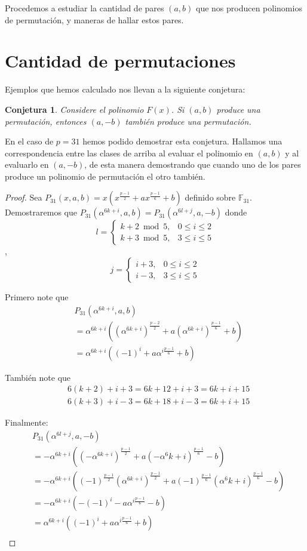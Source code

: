 \documentclass[12pt]{article}
\newtheorem{conjecture}{Conjetura}
\begin{document}
Procedemos a estudiar la cantidad de pares $(a,b)$ que nos producen polinomios de permutaci\'on, y maneras de hallar estos pares.

\section{Cantidad de permutaciones}\label{orto}

Ejemplos que hemos calculado nos llevan a la siguiente conjetura:
\begin{conjecture}
	Considere el polinomio $F(x)$. Si $(a,b)$ produce una permutaci\'on, entonces $(a,-b)$ tambi\'en produce una permutaci\'on.
\end{conjecture}

En el caso de $p=31$ hemos podido demostrar esta conjetura. Hallamos una correspondencia entre las clases de arriba al evaluar el polinomio en $(a,b)$ y al evaluarlo en $(a,-b)$, de esta manera demostrando que cuando uno de los pares produce un polinomio de permutaci\'on el otro tambi\'en.

\begin{proof}
	Sea $P_{31}(x,a,b) = x(x^{\frac{p-1}{2}}+ax^{\frac{p-1}{6}}+b)$ definido sobre $\mathbb{F}_{31}$. Demostraremos que $P_{31}(\alpha^{6k+i},a,b) = P_{31}(\alpha^{6l+j},a,-b)$ donde
	$$
	l =
	\begin{cases}
	k+2 \bmod{5}, & 0 \leq i \leq 2 \\
	k+3 \bmod{5}, & 3 \leq i \leq 5
	\end{cases}
	$$
	,
	$$
	j =
	\begin{cases}
	i+3, & 0 \leq i \leq 2 \\
	i-3, & 3 \leq i \leq 5
	\end{cases}
	$$

	\clearpage
	
	Primero note que 
	\begin{align*}
	&P_{31}(\alpha^{6k+i},a,b) \\
	&=\alpha^{6k+i}((\alpha^{6k+i})^{\frac{p-2}{2}}+a(\alpha^{6k+i})^{\frac{p-1}{6}}+b) \\
	&=\alpha^{6k+i}((-1)^{i}+a\alpha^{i\frac{p-1}{6}}+b)
	\end{align*}

	Tambi\'en note que
	\begin{align*}
	&6(k+2)+i+3=6k+12+i+3=6k+i+15 \\
	&6(k+3)+i-3=6k+18+i-3=6k+i+15
	\end{align*}

	Finalmente:
	\begin{align*}
	&P_{31}(\alpha^{6l+j},a,-b)	\\
	&= -\alpha^{6k+i}((-\alpha^{6k+i})^\frac{p-1}{2}+a(-\alpha^6k+i)^\frac{p-1}{6}-b) \\
	&= -\alpha^{6k+i}((-1)^{\frac{p-1}{2}}(\alpha^{6k+i})^\frac{p-1}{2}+a(-1)^{\frac{p-1}{6}}(\alpha^6k+i)^\frac{p-1}{6}-b) \\
	&= -\alpha^{6k+i}(-(-1)^{i}-a\alpha^{i\frac{p-1}{6}}-b) \\
	&= \alpha^{6k+i}((-1)^{i}+a\alpha^{i\frac{p-1}{6}}+b) \\
	\end{align*}
	
\end{proof}
\end{document}
